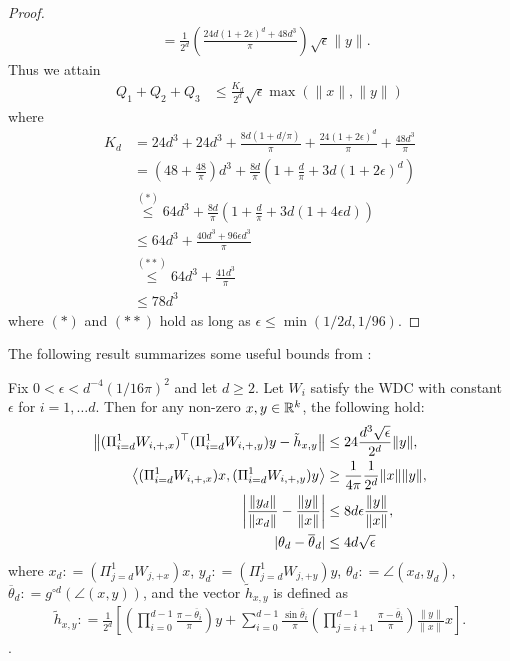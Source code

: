 \documentclass{article}
\begin{document}
\begin{proof}
\begin{align*}
& = \frac{1}{2^d}\left(\frac{24d(1 + 2\epsilon)^d + 48d^3}{\pi}\right)\sqrt{\epsilon}\|y\|.
\end{align*} Thus we attain \begin{align*}
Q_1 + Q_2 + Q_3 & \leq \frac{K_d}{2^d} \sqrt{\epsilon}\max(\|x\|,\|y\|)
\end{align*} where \begin{align*}
K_d & = 24d^3 + 24d^3 + \frac{8d(1 + d/\pi)}{\pi} + \frac{24(1 + 2\epsilon)^d}{\pi} + \frac{48d^3}{\pi} \\
& = \left( 48 + \frac{48}{\pi}\right)d^3 + \frac{8d}{\pi}\left(1 + \frac{d}{\pi} + 3d(1 + 2\epsilon)^d\right) \\
& \stackrel{(*)}{\leq} 64d^3 + \frac{8d}{\pi}\left( 1+ \frac{d}{\pi} + 3d( 1+ 4\epsilon d)\right) \\
& \leq 64d^3 + \frac{40d^3 + 96\epsilon d^3}{\pi} \\
& \stackrel{(**)}{\leq} 64d^3 + \frac{41d^3}{\pi} \\
& \leq 78d^3
\end{align*} where $(*)$ and $(**)$ hold as long as $\epsilon \leq \min(1/2d,1/96)$.
\end{proof}

The following result summarizes some useful bounds from \cite{Hand2017}:

\begin{lem}
Fix $0 < \epsilon < d^{-4}(1/16\pi)^2$ and let $d \geq 2$. Let $W_i$ satisfy the WDC with constant $\epsilon$ for $i = 1,\dots d$. Then for any non-zero $x,y \in \mathbb{R}^k$, the following hold: \begin{align}
\left\|(\Pi_{i=d}^1 W_{i,+,x})^\top(\Pi_{i=d}^1 W_{i,+,y})y - \tilde{h}_{x,y}\right\| & \leq 24 \frac{d^3\sqrt{\epsilon}}{2^d}\|y\|, \label{conc_htilde}\\
\left\langle (\Pi_{i=d}^1 W_{i,+,x})x, (\Pi_{i=d}^1 W_{i,+,y})y \right\rangle & \geq \frac{1}{4\pi}\frac{1}{2^d}\|x\|\|y\|, \label{conc_inn_prod}\\
\left| \frac{\|y_d\|}{\|x_d\|} - \frac{\|y\|}{\|x\|} \right| & \leq 8d\epsilon \frac{\|y\|}{\|x\|}, \label{conc_norm}\\
|\theta_d - \overline{\theta}_d| & \leq 4d\sqrt{\epsilon} \label{conc_angle}
\end{align} where $x_d : = (\Pi_{j=d}^1 W_{j,+x})x$, $y_d: =(\Pi_{j=d}^1 W_{j,+y})y$, $\theta_d : = \angle(x_d,y_d)$, $\overline{\theta}_d : = g^{\circ d}(\angle(x,y))$, and the vector $\tilde{h}_{x,y}$ is defined as \begin{align*}
\tilde{h}_{x,y} : = \frac{1}{2^d}\left[ \left(\prod_{i=0}^{d-1} \frac{\pi - \overline{\theta}_i}{\pi}\right)y + \sum_{i=0}^{d-1}\frac{\sin\overline{\theta}_i}{\pi} \left(\prod_{j=i+1}^{d-1} \frac{\pi - \overline{\theta}_i}{\pi}\right)\frac{\|y\|}{\|x\|}x\right].
\end{align*}.
\end{lem}
\end{document}
